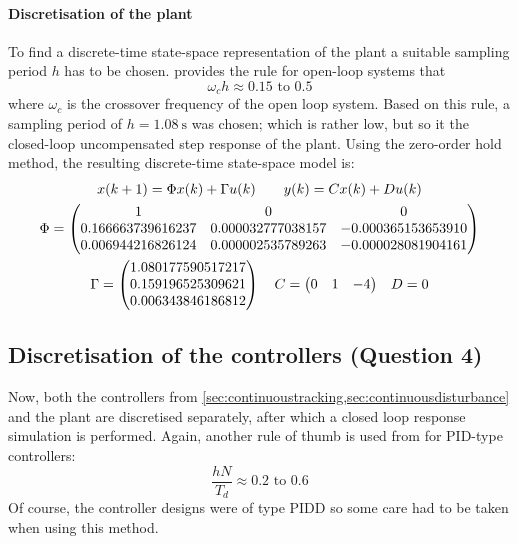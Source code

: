 \paragraph{Discretisation of the plant}
To find a discrete-time state-space representation of the plant a suitable sampling period $h$ has to be chosen. \textcite[300]{astrom} provides the rule for open-loop systems that
$$ \omega_ch \approx 0.15 \text{ to } 0.5$$
where $\omega_c$ is the crossover frequency of the open loop system. Based on this rule, a sampling period of $h = \SI{1.08}{\second}$ was chosen; which is rather low, but so it the closed-loop uncompensated step response of the plant. Using the zero-order hold method, the resulting discrete-time state-space model is:
\begin{equation}
    \begin{gathered}
        x(k+1) = \Phi x(k) + \Gamma u(k) \qquad y(k) = Cx(k) + Du(k)\\
        \Phi = 
        \begin{pmatrix}   
            1        &           0       &            0\\
            0.166663739616237  &  0.000032777038157 &  -0.000365153653910\\
            0.006944216826124 & 0.000002535789263  & -0.000028081904161 \\
        \end{pmatrix}\\
        \Gamma = \begin{pmatrix}
               1.080177590517217 \\
                0.159196525309621 \\
                 0.006343846186812\\ 
        \end{pmatrix}\quad C = \mqty(0 & 1 & -4) \quad D = 0
    \end{gathered}
\end{equation}

\subsection{Discretisation of the controllers \textnormal{\phantom{xxx}(Question 4)}}
Now, both the controllers from \cref{sec:continuoustracking,sec:continuousdisturbance} and the plant are discretised separately, after which a closed loop response simulation is performed. Again, another rule of thumb is used from \textcite[317]{astrom} for PID-type controllers:
$$ \frac{hN}{T_d} \approx 0.2 \text{ to } 0.6$$
Of course, the controller designs were of type PIDD so some care had to be taken when using this method.

